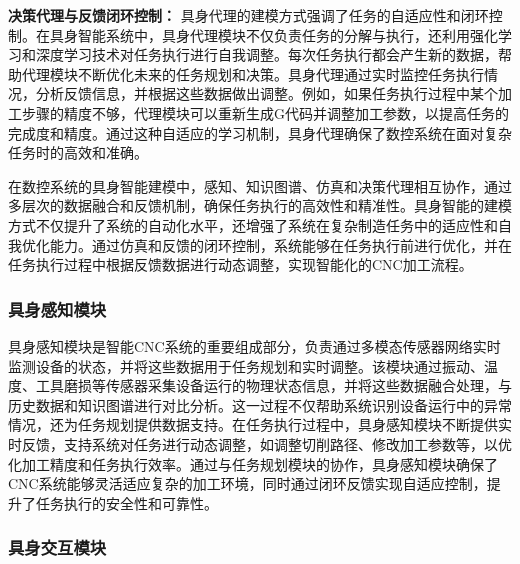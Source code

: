 \documentclass[preprint,12pt]{elsarticle}
\begin{document}
\textbf{决策代理与反馈闭环控制：}  
具身代理的建模方式强调了任务的自适应性和闭环控制。在具身智能系统中，具身代理模块不仅负责任务的分解与执行，还利用强化学习和深度学习技术对任务执行进行自我调整。每次任务执行都会产生新的数据，帮助代理模块不断优化未来的任务规划和决策。具身代理通过实时监控任务执行情况，分析反馈信息，并根据这些数据做出调整。例如，如果任务执行过程中某个加工步骤的精度不够，代理模块可以重新生成G代码并调整加工参数，以提高任务的完成度和精度。通过这种自适应的学习机制，具身代理确保了数控系统在面对复杂任务时的高效和准确。

在数控系统的具身智能建模中，感知、知识图谱、仿真和决策代理相互协作，通过多层次的数据融合和反馈机制，确保任务执行的高效性和精准性。具身智能的建模方式不仅提升了系统的自动化水平，还增强了系统在复杂制造任务中的适应性和自我优化能力。通过仿真和反馈的闭环控制，系统能够在任务执行前进行优化，并在任务执行过程中根据反馈数据进行动态调整，实现智能化的CNC加工流程。


\subsubsection{具身感知模块}

具身感知模块是智能CNC系统的重要组成部分，负责通过多模态传感器网络实时监测设备的状态，并将这些数据用于任务规划和实时调整。该模块通过振动、温度、工具磨损等传感器采集设备运行的物理状态信息，并将这些数据融合处理，与历史数据和知识图谱进行对比分析。这一过程不仅帮助系统识别设备运行中的异常情况，还为任务规划提供数据支持。在任务执行过程中，具身感知模块不断提供实时反馈，支持系统对任务进行动态调整，如调整切削路径、修改加工参数等，以优化加工精度和任务执行效率。通过与任务规划模块的协作，具身感知模块确保了CNC系统能够灵活适应复杂的加工环境，同时通过闭环反馈实现自适应控制，提升了任务执行的安全性和可靠性。


\subsubsection{具身交互模块}
\end{document}
